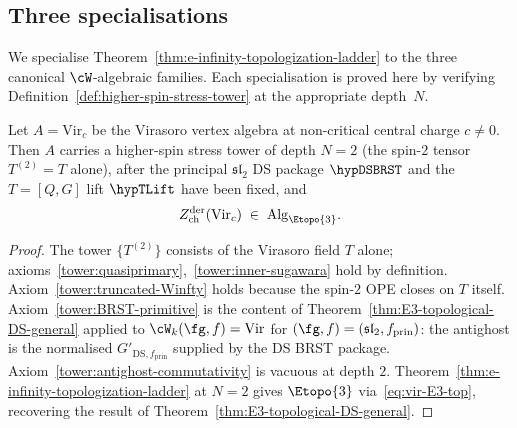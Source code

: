 \subsection{Three specialisations}
\label{subsec:three-specialisations}

We specialise Theorem~\ref{thm:e-infinity-topologization-ladder} to the
three canonical $\cW$-algebraic families. Each specialisation is
proved here by verifying Definition~\ref{def:higher-spin-stress-tower}
at the appropriate depth~$N$.

\begin{theorem}[$\Ethree$-topological: Virasoro is $N=2$;
\ClaimStatusProvedHere; licensing $\beta+\gamma+\delta$ via
\(\hypDSBRST+\hypTLift\)]
\label{thm:e-infinity-specialisation-Vir}
Let $A = \mathrm{Vir}_c$ be the Virasoro vertex algebra at non-critical
central charge $c \ne 0$. Then $A$ carries a higher-spin stress tower of
depth $N = 2$ \textup{(}the spin-$2$ tensor $T^{(2)} = T$ alone\textup{)},
after the principal \(\mathfrak{sl}_2\) DS package \(\hypDSBRST\) and
the \(T=[Q,G]\) lift \(\hypTLift\) have been fixed,
and
\begin{equation}\label{eq:vir-E3-top}
Z^{\mathrm{der}}_{\mathrm{ch}}(\mathrm{Vir}_c) \;\in\;
\mathrm{Alg}_{\Etopo{3}}.
\end{equation}
\end{theorem}

\begin{proof}
The tower $\{T^{(2)}\}$ consists of the Virasoro field $T$ alone;
axioms~\ref{tower:quasiprimary},~\ref{tower:inner-sugawara} hold by
definition. Axiom~\ref{tower:truncated-Winfty} holds because the
spin-$2$ OPE closes on $T$ itself. Axiom~\ref{tower:BRST-primitive} is
the content of Theorem~\ref{thm:E3-topological-DS-general} applied to
$\cW_k(\fg, f) = \mathrm{Vir}$ for $(\fg, f) = (\mathfrak{sl}_2,
f_{\mathrm{prin}})$: the antighost is the normalised
\(G'_{\mathrm{DS},f_{\mathrm{prin}}}\) supplied by the DS BRST
package.
Axiom~\ref{tower:antighost-commutativity} is vacuous at depth $2$.
Theorem~\ref{thm:e-infinity-topologization-ladder} at $N = 2$ gives
$\Etopo{3}$ via~\eqref{eq:vir-E3-top}, recovering the result of
Theorem~\ref{thm:E3-topological-DS-general}.
\end{proof}

